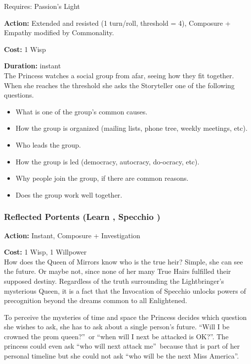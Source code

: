 \noindent Requires: Passion's Light

\noindent \textbf{Action:} Extended and resisted (1 turn/roll, threshold = 4), Composure + Empathy modified by Commonality.

\noindent \textbf{Cost:} 1 Wisp

\noindent \textbf{Duration:} instant \\

\noindent The Princess watches a social group from afar, seeing how they fit together. When she reaches the threshold she asks the Storyteller one of the following questions. 

    \begin{itemize}\item What is one of the group's common causes.
    \item How the group is organized (mailing lists, phone tree, weekly meetings, etc).
    \item Who leads the group. 
    \item How the group is led (democracy, autocracy, do-ocracy, etc).
    \item Why people join the group, if there are common reasons.
    \item Does the group work well together.
    \end{itemize}

\subsubsection*{Reflected Portents (Learn \textbullet\textbullet\textbullet, Specchio \textbullet\textbullet\textbullet)}

\noindent \textbf{Action:} Instant, Composure + Investigation

\noindent \textbf{Cost:} 1 Wisp, 1 Willpower \\

\noindent How does the Queen of Mirrors know who is the true heir? Simple, she can see the future. Or maybe not, since none of her many True Hairs fulfilled their supposed destiny. Regardless of the truth surrounding the Lightbringer's mysterious Queen, it is a fact that the Invocation of Specchio unlocks powers of precognition beyond the dreams common to all Enlightened.

To perceive the mysteries of time and space the Princess decides which question she wishes to ask, she has to ask about a single person's future. \textquotedblleft Will I be crowned the prom queen?\textquotedblright\, or \textquotedblleft when will I next be attacked is OK?\textquotedblright. The princess could even ask \textquotedblleft who will next attack me\textquotedblright\, because that is part of her personal timeline but she could not ask \textquotedblleft who will be the next Miss America\textquotedblright.

